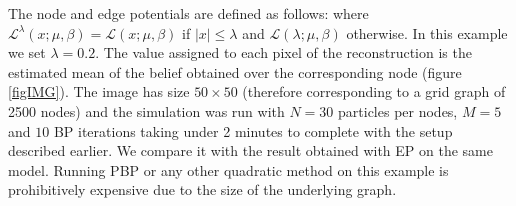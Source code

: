 The node and edge potentials are defined as follows:
where $\mathcal L^{\lambda}(x;\mu,\beta)=\mathcal L(x;\mu,\beta)$ if $|x|\le \lambda$ and $\mathcal L(\lambda;\mu,\beta)$ otherwise. In this example we set $\lambda=0.2$. The value assigned to each pixel of the reconstruction is the estimated mean of the belief obtained over the corresponding node (figure \ref{figIMG}). The image has size $50\times 50$ (therefore corresponding to a grid graph of 2500 nodes) and the simulation was run with $N=30$ particles per nodes, $M=5$ and $10$ BP iterations taking under 2 minutes to complete with the setup described earlier. 
We compare it with the result obtained with EP on the same model. 
Running PBP or any other quadratic method on this example is prohibitively expensive due to the size of the underlying graph.

